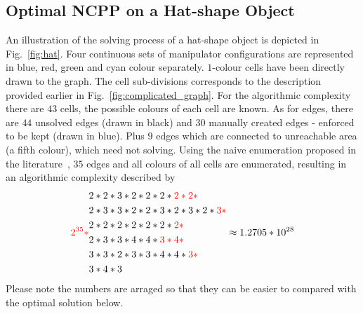 \documentclass[conference]{IEEEtran}
\begin{document}
\subsection{Optimal NCPP on a Hat-shape Object}
An illustration of the solving process of a hat-shape object is depicted in Fig.~\ref{fig:hat}. 
Four continuous sets of manipulator configurations are represented in blue, red, green and cyan colour separately. $1$-colour cells have been directly drawn to the graph. 
The cell sub-divisions corresponds to the description provided earlier in Fig.~\ref{fig:complicated_graph}.
For the algorithmic complexity there are $43$ cells, the possible colours of each cell are known. As for edges, there are $44$ unsolved edges (drawn in black) and $30$ manually created edges - enforced to be kept (drawn in blue). Plus $9$ edges which are connected to unreachable area (a fifth colour), which need not solving. Using the naive enumeration proposed in the literature~\cite{Yang2020Cellular}, $35$ edges and all colours of all cells are enumerated, resulting in an algorithmic complexity described by 
\begin{equation}
{\color{red}2^{35}*}
\begin{aligned}
&2*2*3*2*2*2*{\color{red}2*2*}\\
&2*3*3*2*2*3*2*3*2*{\color{red}3*}\\
&2*2*2*2*2*2*{\color{red}2*}\\
&2*3*3*4*4*{\color{red}3*4*}\\
&3*3*2*3*3*4*4*{\color{red}3*}\\
&3*4*3
\end{aligned}
\approx 1.2705*10^{28}
\end{equation}
Please note the numbers are arraged so that they can be easier to compared with the optimal solution below. 
\end{document}
